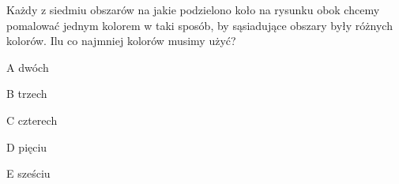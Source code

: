 \begin{tresc}
Każdy z siedmiu obszarów na jakie podzielono koło na rysunku obok chcemy pomalować jednym kolorem w taki sposób, by sąsiadujące obszary były różnych kolorów. Ilu co najmniej kolorów musimy użyć?
\end{tresc}
\begin{wariant}{A} dwóch \end{wariant}
\begin{wariant}{B} trzech \end{wariant}
\begin{wariant}{C} czterech \end{wariant}
\begin{wariant}{D} pięciu \end{wariant}
\begin{wariant}{E} sześciu \end{wariant}
